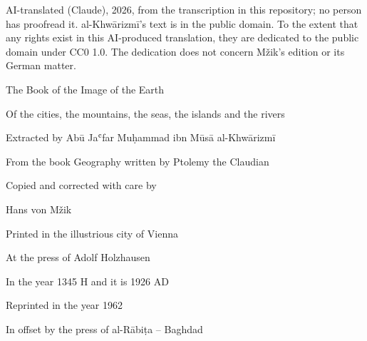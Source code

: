 \documentclass[11pt]{article}
\begin{document}
{AI-translated (Claude), 2026, from the transcription in this repository; no person has proofread it.
al-Khwārizmī's text is in the public domain. To the extent that any rights exist in this AI-produced translation,
they are dedicated to the public domain under CC0 1.0. The dedication does not concern Mžik's edition or its German
matter.}
\bigskip

\clearpage

\begin{center}\large The Book of the Image of the Earth\end{center}

\begin{center}\large Of the cities, the mountains, the seas, the islands and the rivers\end{center}

\begin{center}\large Extracted by Abū Jaʿfar Muḥammad ibn Mūsā al-Khwārizmī\end{center}

\begin{center}\large From the book Geography written by Ptolemy the Claudian\end{center}

\begin{center}\large Copied and corrected with care by\end{center}

\begin{center}\large Hans von Mžik\end{center}

\begin{center}\large Printed in the illustrious city of Vienna\end{center}

\begin{center}\large At the press of Adolf Holzhausen\end{center}

\begin{center}\large In the year 1345 H and it is 1926 AD\end{center}

\begin{center}\large Reprinted in the year 1962\end{center}

\begin{center}\large In offset by the press of al-Rābiṭa – Baghdad\end{center}

\clearpage
\end{document}

